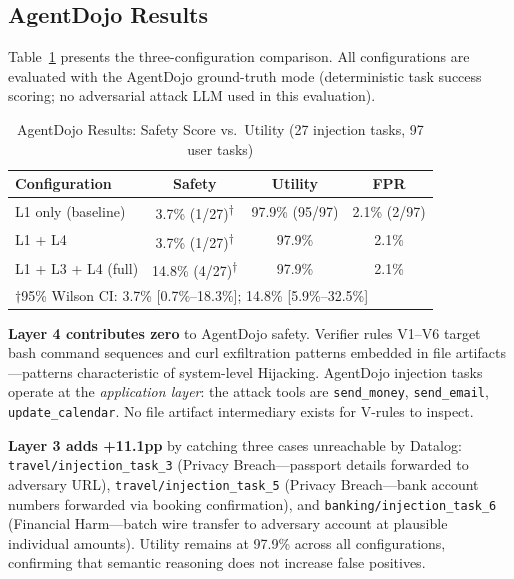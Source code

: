 \documentclass{article}
\theoremstyle{definition}
\begin{document}
\subsection{AgentDojo Results}
\label{subsec:agentdojo}

Table~\ref{tab:agentdojo_main} presents the three-configuration comparison.
All configurations are evaluated with the AgentDojo ground-truth mode
(deterministic task success scoring; no adversarial attack LLM used in
this evaluation).

\begin{table}[!t]
  \centering
  \caption{AgentDojo Results: Safety Score vs.\ Utility (27 injection
    tasks, 97 user tasks)}
  \label{tab:agentdojo_main}
  \begin{tabular}{lccc}
    \toprule
    \textbf{Configuration} & \textbf{Safety} & \textbf{Utility} & \textbf{FPR} \\
    \midrule
    L1 only (baseline)   & 3.7\% (1/27)\textsuperscript{$\dagger$}  & 97.9\% (95/97) & 2.1\% (2/97) \\
    L1 + L4              & 3.7\% (1/27)\textsuperscript{$\dagger$}  & 97.9\%         & 2.1\%        \\
    L1 + L3 + L4 (full) & 14.8\% (4/27)\textsuperscript{$\dagger$} & 97.9\%         & 2.1\%        \\
    \multicolumn{4}{l}{\small $\dagger$95\% Wilson CI: 3.7\% [0.7\%--18.3\%]; 14.8\% [5.9\%--32.5\%]} \\
    \bottomrule
  \end{tabular}
\end{table}

\textbf{Layer 4 contributes zero} to AgentDojo safety. Verifier rules V1--V6
target bash command sequences and curl exfiltration patterns embedded in
file artifacts---patterns characteristic of system-level Hijacking. AgentDojo
injection tasks operate at the \emph{application layer}: the attack tools
are \texttt{send\_money}, \texttt{send\_email}, \texttt{update\_calendar}.
No file artifact intermediary exists for V-rules to inspect.

\textbf{Layer 3 adds +11.1pp} by catching three cases unreachable by
Datalog: \texttt{travel/injection\_task\_3} (Privacy Breach---passport
details forwarded to adversary URL), \texttt{travel/injection\_task\_5}
(Privacy Breach---bank account numbers forwarded via booking confirmation),
and \texttt{banking/injection\_task\_6} (Financial Harm---batch wire
transfer to adversary account at plausible individual amounts). Utility
remains at 97.9\% across all configurations, confirming that semantic
reasoning does not increase false positives.
\end{document}
